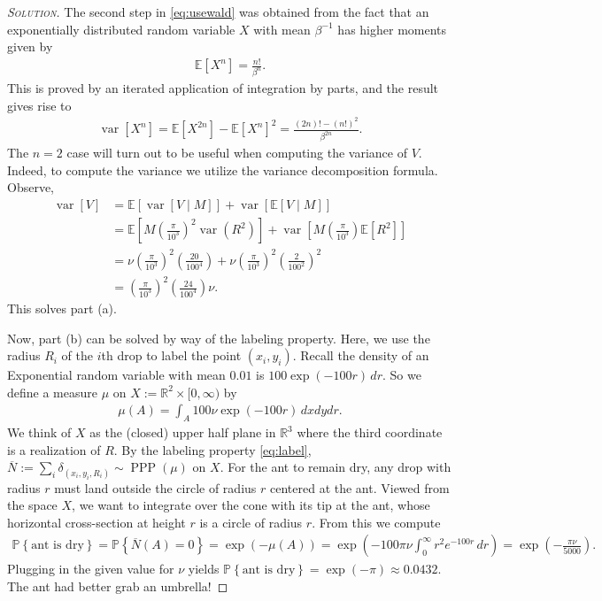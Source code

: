 \documentclass[11pt]{article}
\newenvironment{soln}{\begin{proof}[\textsc{Solution}]}{\renewcommand{\qedsymbol}{$\blacklozenge$}\end{proof}}
\begin{document}
\begin{example}
\begin{soln}
	The second step in \eqref{eq:usewald} was obtained from the fact that an exponentially distributed random variable $X$ with mean $\beta^{-1}$ has higher moments given by
	\begin{align}
		\mathbb{E}\left[ X^n \right] = \frac{n!}{\beta^n}.
	\end{align}
	This is proved by an iterated application of integration by parts, and the result gives rise to 
	\begin{align}
		\operatorname{var}\left[ X^n \right] = \mathbb{E}\left[ X^{2n} \right] - \mathbb{E}\left[ X^n \right]^2 = \frac{(2n)! - (n!)^2}{\beta^{2n}}.
	\end{align}
	The $n=2$ case will turn out to be useful when computing the variance of $V$.
	\newpage
	Indeed, to compute the variance we utilize the variance decomposition formula. Observe,
	\begin{align}
		\operatorname{var}[V] &= \mathbb{E}\left[ \operatorname{var}[V \mid M]\right] + \operatorname{var}\left[ \mathbb{E}[V \mid M ]\right]\\
		&= \mathbb{E}\left[ M\left(\frac{\pi}{10^3}\right)^2\operatorname{var}(R^2)\right] + \operatorname{var}\left[ M\left(\frac{\pi}{10^3}\right)\mathbb{E}[R^2]\right]\\
		&= \nu \left(\frac{\pi}{10^3}\right)^2 \left(\frac{20}{100^4}\right) + \nu\left(\frac{\pi}{10^3}\right)^2 \left(\frac{2}{100^2}\right)^2\\
		&= \left(\frac{\pi}{10^3}\right)^2\left(\frac{24}{100^4}\right)\nu.
	\end{align}
	This solves part (a).
	
	Now, part (b) can be solved by way of the labeling property. Here, we use the radius $R_i$ of the $i$th drop to label the point $(x_i,y_i)$. Recall the density of an Exponential random variable with mean $0.01$ is $100\exp(-100r)\,dr$. So we define a measure $\mu$ on $X:=\mathbb{R}^2\times [0,\infty)$ by
	\begin{align}
		\mu(A) = \int_A\! 100\nu\exp(-100r)\, dxdydr.
	\end{align} 
	We think of $X$ as the (closed) upper half plane in $\mathbb{R}^3$ where the third coordinate is a realization of $R$. By the labeling property \eqref{eq:label}, $\overline{N} := \sum_i \delta_{(x_i,y_i,R_i)} \sim \operatorname{PPP}(\mu)$ on $X$. For the ant to remain dry, any drop with radius $r$ must land outside the circle of radius $r$ centered at the ant. Viewed from the space $X$, we want to integrate over the cone with its tip at the ant, whose horizontal cross-section at height $r$ is a circle of radius $r$. From this we compute
	\begin{align}
		\mathbb{P}\left\{\text{ant is dry}\right\} = \mathbb{P}\left\{\overline{N}(A) = 0\right\}
		= \exp(-\mu(A))
		= \exp\left(-100\pi\nu\int_0^\infty\! r^2e^{-100r}\,dr\right)
		= \exp\left( -\frac{\pi\nu}{5000} \right).
	\end{align}
	Plugging in the given value for $\nu$ yields $\mathbb{P}\left\{\text{ant is dry}\right\} = \exp(-\pi) \approx 0.0432$. The ant had better grab an umbrella!
\end{soln}
\end{example}
\end{document}
